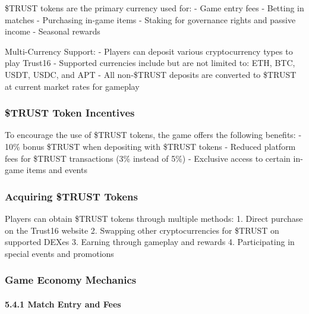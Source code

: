 \documentclass[]{article}
\begin{document}
\$TRUST tokens are the primary currency used for: - Game entry fees -
Betting in matches - Purchasing in-game items - Staking for governance
rights and passive income - Seasonal rewards

Multi-Currency Support: - Players can deposit various cryptocurrency
types to play Trust16 - Supported currencies include but are not limited
to: ETH, BTC, USDT, USDC, and APT - All non-\$TRUST deposits are
converted to \$TRUST at current market rates for gameplay

\hypertarget{trust-token-incentives}{%
\subsubsection{\$TRUST Token
Incentives}\label{trust-token-incentives}}

To encourage the use of \$TRUST tokens, the game offers the following
benefits: - 10\% bonus \$TRUST when depositing with \$TRUST tokens -
Reduced platform fees for \$TRUST transactions (3\% instead of 5\%) -
Exclusive access to certain in-game items and events

\hypertarget{acquiring-trust-tokens}{%
\subsubsection{Acquiring \$TRUST
Tokens}\label{acquiring-trust-tokens}}

Players can obtain \$TRUST tokens through multiple methods: 1. Direct
purchase on the Trust16 website 2. Swapping other cryptocurrencies for
\$TRUST on supported DEXes 3. Earning through gameplay and rewards 4.
Participating in special events and promotions

\hypertarget{game-economy-mechanics}{%
\subsubsection{Game Economy
Mechanics}\label{game-economy-mechanics}}

\hypertarget{match-entry-and-fees}{%
\paragraph{5.4.1 Match Entry and Fees}\label{match-entry-and-fees}}
\end{document}
